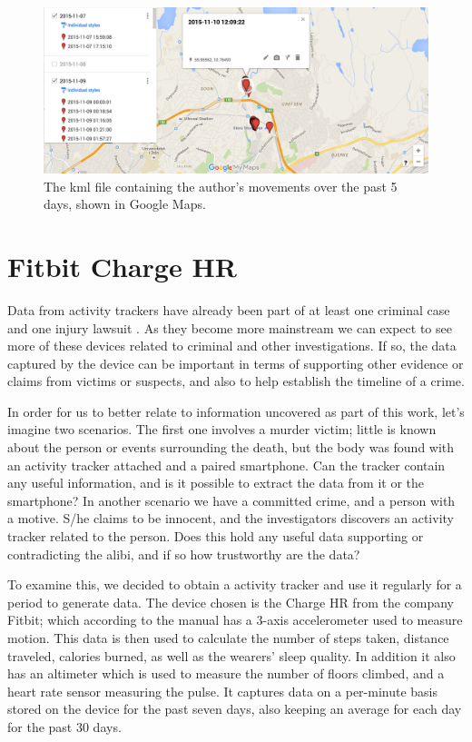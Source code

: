 \documentclass[a4paper,11pt,dvips]{article}
\begin{document}
\begin{figure}
\noindent
\includegraphics[natwidth=2096bp,natheight=906bp,width=\linewidth]{geodata}
\caption{The kml file containing the author's movements over the past 5 days, shown in Google Maps.}
\label{fig:geodata}
\end{figure}


\section{Fitbit Charge HR}

Data from activity trackers have already been part of at least one criminal case \citep{Snyder:2015} and one injury lawsuit \citep{Olson:2014}. As they become more mainstream we can expect to see more of these devices related to criminal and other investigations. If so, the data captured by the device can be important in terms of supporting other evidence or claims from victims or suspects, and also to help establish the timeline of a crime.

In order for us to better relate to information uncovered as part of this work, let's imagine two scenarios. The first one involves a murder victim; little is known about the person or events surrounding the death, but the body was found with an activity tracker attached and a paired smartphone. Can the tracker contain any useful information, and is it possible to extract the data from it or the smartphone? In another scenario we have a committed crime, and a person with a motive. S/he claims to be innocent, and the investigators discovers an activity tracker related to the person. Does this hold any useful data supporting or contradicting the alibi, and if so how trustworthy are the data?

To examine this, we decided to obtain a activity tracker and use it regularly for a period to generate data. The device chosen is the Charge HR from the company Fitbit; which according to the manual has a 3-axis accelerometer used to measure motion. This data is then used to calculate the number of steps taken, distance traveled, calories burned, as well as the wearers' sleep quality. In addition it also has an altimeter which is used to measure the number of floors climbed, and a heart rate sensor measuring the pulse. It captures data on a per-minute basis stored on the device for the past seven days, also keeping an average for each day for the past 30 days.
\end{document}
